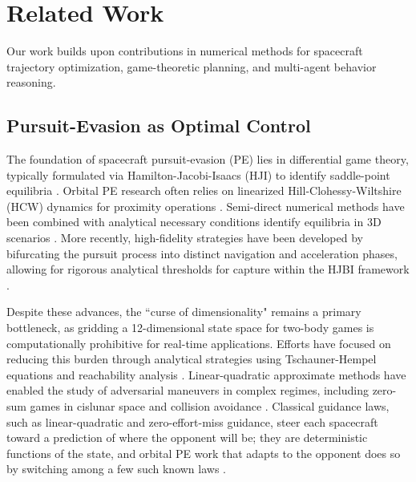 \documentclass[letterpaper, 10 pt, conference]{ieeeconf}  %
\begin{document}
\section{Related Work}
\label{sec:related_work} 
% 

Our work builds upon contributions in numerical methods for spacecraft trajectory optimization, game-theoretic planning, and multi-agent behavior reasoning. 


\subsection{Pursuit-Evasion as Optimal Control}

The foundation of spacecraft pursuit-evasion (PE) lies in differential game theory, typically formulated via Hamilton-Jacobi-Isaacs (HJI) to identify saddle-point equilibria \cite{bacsar1998dynamic}. Orbital PE research often relies on linearized Hill-Clohessy-Wiltshire (HCW) dynamics for proximity operations \cite{stupik2012optimal} \cite{innocentiGameTheoreticStrategies2016} \cite{liDimensionreductionSolutionFreetime2019}. Semi-direct numerical methods have been combined with analytical necessary conditions identify equilibria in 3D scenarios \cite{pontani2009numerical}. More recently, high-fidelity strategies have been developed by bifurcating the pursuit process into distinct navigation and acceleration phases, allowing for rigorous analytical thresholds for capture within the HJBI framework \cite{chen_equilibrium_2024}.

Despite these advances, the ``curse of dimensionality" remains a primary bottleneck, as gridding a 12-dimensional state space for two-body games is computationally prohibitive for real-time applications. Efforts have focused on reducing this burden through analytical strategies using Tschauner-Hempel equations \cite{fu_analytical_2025} and reachability analysis \cite{jia_approximate_2025} \cite{venigalla20193}. Linear-quadratic approximate methods have enabled the study of adversarial maneuvers in complex regimes, including zero-sum games in cislunar space \cite{fotiadis_adversarial_2025} and collision avoidance \cite{venigallaCooperativeNonCooperativeApproaches2022}. Classical guidance laws, such as linear-quadratic and zero-effort-miss guidance, steer each spacecraft toward a prediction of where the opponent will be; they are deterministic functions of the state, and orbital PE work that adapts to the opponent does so by switching among a few such known laws \cite{ye2021multiple, wang2024imm}. 
\end{document}
